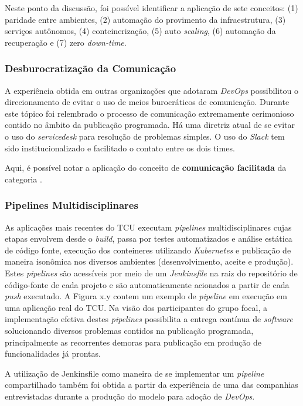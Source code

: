 Neste ponto da discussão, foi possível identificar a aplicação de sete
conceitos: (1) paridade entre ambientes, (2) automação do provimento da
infraestrutura, (3) serviços autônomos, (4) conteinerização, (5) auto {\it scaling},
(6) automação da recuperação e (7) zero {\it down-time}.

\subsubsection{Desburocratização da Comunicação}

A experiência obtida em outras organizações que adotaram {\it DevOps}
possibilitou o direcionamento de evitar o uso de meios burocráticos de
comunicação. Durante este tópico foi relembrado o processo de comunicação
extremamente cerimonioso contido no âmbito da publicação programada. Há uma
diretriz atual de se evitar o uso do {\it servicedesk} para resolução de
problemas simples. O uso do {\it Slack} tem sido institucionalizado e facilitado
o contato entre os dois times.

Aqui, é possível notar a aplicação do conceito de {\bf comunicação facilitada}
da categoria .

\subsubsection{Pipelines Multidisciplinares}

As aplicações mais recentes do \acrshort{TCU} executam {\it pipelines}
multidisciplinares cujas etapas envolvem desde o {\it build}, passa por testes
automatizados e análise estática de código fonte, execução dos conteineres
utilizando {\it Kubernetes} e publicação de maneira isonômica nos diversos
ambientes (desenvolvimento, aceite e produção). Estes {\it pipelines} são
acessíveis por meio de um {\it Jenkinsfile} na raiz do repositório de código-fonte
de cada projeto e são automaticamente acionados a partir de cada {\it push}
executado. A Figura x.y contem um exemplo de {\it pipeline} em execução em uma
aplicação real do \acrshort{TCU}. Na visão dos participantes do grupo focal,
a implementação efetiva destes {\it pipelines} possibilita a entrega contínua
de {\it software} solucionando diversos problemas contidos na publicação
programada, principalmente as recorrentes demoras para publicação em produção
de funcionalidades já prontas.

A utilização de Jenkinsfile como maneira de se implementar um {\it pipeline}
compartilhado também foi obtida a partir da experiência de uma das companhias
entrevistadas durante a produção do modelo para adoção de {\it DevOps}.

